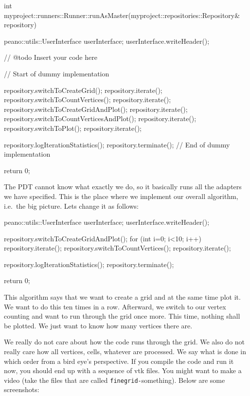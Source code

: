 \begin{code}
int myproject::runners::Runner::runAsMaster(myproject::repositories::Repository& repository) {
  peano::utils::UserInterface userInterface;
  userInterface.writeHeader();

  // @todo Insert your code here
  
  // Start of dummy implementation
  
  repository.switchToCreateGrid(); repository.iterate();
  repository.switchToCountVertices(); repository.iterate();
  repository.switchToCreateGridAndPlot(); repository.iterate();
  repository.switchToCountVerticesAndPlot(); repository.iterate();
  repository.switchToPlot(); repository.iterate();

 
 
  repository.logIterationStatistics();
  repository.terminate();
  // End of dummy implementation

  return 0;
}
\end{code}

The PDT cannot know what exactly we do, so it basically runs all the adapters we
have specified.
This is the place where we implement our overall algorithm, i.e.~the big
picture.
Lets change it as follows:

\begin{code}
  peano::utils::UserInterface userInterface;
  userInterface.writeHeader();

  repository.switchToCreateGridAndPlot();
  for (int i=0; i<10; i++) repository.iterate();
  repository.switchToCountVertices(); repository.iterate();

  repository.logIterationStatistics();
  repository.terminate();

  return 0;
\end{code}

\noindent
This algorithm says that we want to create a grid and at the same time plot it.
We want to do this ten times in a row.
Afterward, we switch to our vertex counting and want to run through the grid
once more. 
This time, nothing shall be plotted.
We just want to know how many vertices there are.


We really do not care about how the code runs through the grid.
We also do not really care how all vertices, cells, whatever are processed.
We say what is done in which order from a bird eye's perspective.
If you compile the code and run it now, you should end up with a sequence of vtk
files. 
You might want to make a video (take the files that are called
\texttt{finegrid-}something).
Below are some screenshots:



